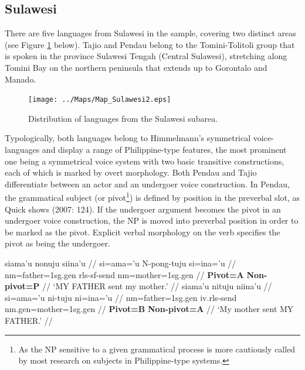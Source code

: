 \subsection{Sulawesi}

There are five languages from Sulawesi in the sample, covering two distinct areas (see Figure \ref{map:Sul} below). Tajio and Pendau belong to the Tomini-Tolitoli group that is spoken in the province Sulawesi Tengah (Central Sulawesi), stretching along Tomini Bay on the northern peninsula that extends up to Gorontalo and Manado. 

\begin{figure}
\begin{center}
\texttt{[image: ../Maps/Map\_Sulawesi2.eps]}
\caption{Distribution of languages from the Sulawesi subarea.}\label{map:Sul}
\end{center}
\end{figure}

Typologically, both languages belong to Himmelmann's symmetrical voice-languages and display a range of Philippine-type features, the most prominent one being a symmetrical voice system with two basic transitive constructions, each of which is marked by overt morphology. Both Pendau and Tajio differentiate between an actor and an undergoer voice construction. In Pendau, the grammatical subject (or pivot\footnote{As the NP sensitive to a given grammatical process is more cautiously called by most research on subjects in Philippine-type systems.}) is defined by position in the preverbal slot, as Quick shows (2007: 124). If the undergoer argument becomes the pivot in an undergoer voice construction, the NP is moved into preverbal position in order to be marked as the pivot. Explicit verbal morphology on the verb specifies the pivot as being the undergoer.

\pex 
\a \label{Pendau_ex1}
\begingl
\gla siama'u nonuju siina'u // 
\glb si=ama='u N-pong-tuju si=ina='u //
\glc \acs{nm}=father=\acs{1}\acs{sg}.\acs{gen} \acs{rls}-\acs{sf}-send \acs{nm}=mother=\acs{1}\acs{sg}.\acs{gen} //
\gld \textbf{Pivot=A} {} \textbf{Non-pivot=P} //
\glft `MY FATHER sent my mother.' // 
\endgl
\a \label{Pendau_ex2}
\begingl
\gla siama'u nituju niina'u // 
\glb si=ama='u ni-tuju ni=ina='u //
\glc \acs{nm}=father=\acs{1}\acs{sg}.\acs{gen} \acs{iv}.\acs{rls}-send \acs{nm}.\acs{gen}=mother=\acs{1}\acs{sg}.\acs{gen} //
\gld \textbf{Pivot=B} {} \textbf{Non-pivot=A} //
\glft `My mother sent MY FATHER.' // 
\endgl
\xe

